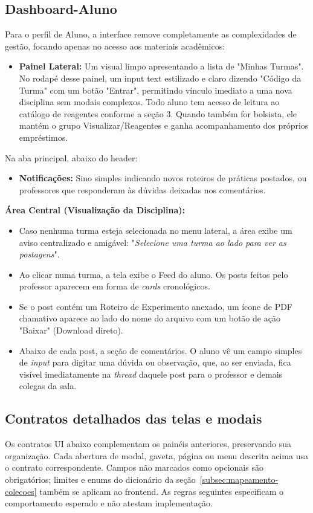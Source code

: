 \subsection{Dashboard-Aluno}
Para o perfil de Aluno, a interface remove completamente as complexidades de gestão, focando apenas no acesso aos materiais acadêmicos:
\begin{itemize}
    \item \textbf{Painel Lateral:} Um visual limpo apresentando a lista de "Minhas Turmas". No rodapé desse painel, um input text estilizado e claro dizendo "Código da Turma" com um botão "Entrar", permitindo vínculo imediato a uma nova disciplina sem modais complexos. Todo aluno tem acesso de leitura ao catálogo de reagentes conforme a seção 3. Quando também for bolsista, ele mantém o grupo Visualizar/Reagentes e ganha acompanhamento dos próprios empréstimos.

\end{itemize}
Na aba principal, abaixo do header:
\begin{itemize}
    \item \textbf{Notificações:} Sino simples indicando novos roteiros de práticas postados, ou professores que responderam às dúvidas deixadas nos comentários.
\end{itemize}
\textbf{Área Central (Visualização da Disciplina):}
\begin{itemize}
    \item Caso nenhuma turma esteja selecionada no menu lateral, a área exibe um aviso centralizado e amigável: "\textit{Selecione uma turma ao lado para ver as postagens}".
    \item Ao clicar numa turma, a tela exibe o Feed do aluno. Os posts feitos pelo professor aparecem em forma de \textit{cards} cronológicos.
    \item Se o post contém um Roteiro de Experimento anexado, um ícone de PDF chamativo aparece ao lado do nome do arquivo com um botão de ação "Baixar" (Download direto).
    \item Abaixo de cada post, a seção de comentários. O aluno vê um campo simples de \textit{input} para digitar uma dúvida ou observação, que, ao ser enviada, fica visível imediatamente na \textit{thread} daquele post para o professor e demais colegas da sala.
\end{itemize}

\subsection{Contratos detalhados das telas e modais}
\label{sec:contratos-telas}
Os contratos UI abaixo complementam os painéis anteriores, preservando sua organização. Cada abertura de modal, gaveta, página ou menu descrita acima usa o contrato correspondente. Campos não marcados como opcionais são obrigatórios; limites e enums do dicionário da seção~\ref{subsec:mapeamento-colecoes} também se aplicam ao frontend. As regras seguintes especificam o comportamento esperado e não atestam implementação.

